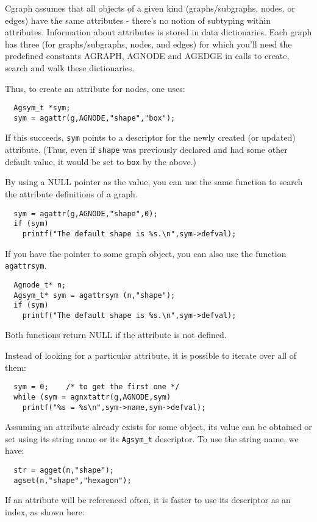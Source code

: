 \documentclass[11pt,letterpaper]{article}
\begin{document}
Cgraph assumes that all objects of a given kind (graphs/subgraphs,
nodes, or edges) have the same attributes - there's no notion of
subtyping within attributes.   Information about attributes is 
stored in data dictionaries.  Each graph has three (for
graphs/subgraphs, nodes, and edges) for which you'll need the
predefined constants AGRAPH, AGNODE and AGEDGE in
calls to create, search and walk these dictionaries.

Thus, to create an attribute for nodes, one uses:
\begin{verbatim}
  Agsym_t *sym;
  sym = agattr(g,AGNODE,"shape","box");
\end{verbatim}
If this succeeds, \verb"sym" points to a descriptor for the 
newly created (or updated) attribute.  (Thus, even if \verb"shape"
was previously declared and had some other default value,
it would be set to \verb"box" by the above.)

By using a NULL pointer as the value,
you can use the same function to search the attribute definitions of a graph.
\begin{verbatim}
  sym = agattr(g,AGNODE,"shape",0);
  if (sym) 
    printf("The default shape is %s.\n",sym->defval);
\end{verbatim}
If you have the pointer to some graph object, you can also use the function
\verb"agattrsym".  
\begin{verbatim}
  Agnode_t* n;
  Agsym_t* sym = agattrsym (n,"shape");
  if (sym) 
    printf("The default shape is %s.\n",sym->defval);
\end{verbatim}
Both functions return NULL if the attribute is not defined.

Instead of looking for a particular attribute, it is possible to
iterate over all of them:

\begin{verbatim}
  sym = 0;    /* to get the first one */
  while (sym = agnxtattr(g,AGNODE,sym)
    printf("%s = %s\n",sym->name,sym->defval);
\end{verbatim}

Assuming an attribute already exists for some object, its value can be
obtained or set using its string name or its \verb"Agsym_t" descriptor.
To use the string name, we have:

\begin{verbatim}
  str = agget(n,"shape");
  agset(n,"shape","hexagon");
\end{verbatim}

If an attribute will be referenced often, it is faster to
use its descriptor as an index, as shown here:
\end{document}
